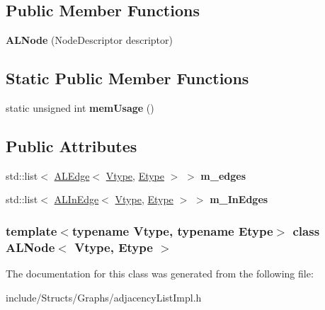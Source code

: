 \subsection*{Public Member Functions}
\begin{DoxyCompactItemize}
\item 
\hypertarget{class_a_l_node_a3131171c179e3556dbb77df163d859de}{
{\bfseries ALNode} (NodeDescriptor descriptor)}
\label{class_a_l_node_a3131171c179e3556dbb77df163d859de}

\end{DoxyCompactItemize}
\subsection*{Static Public Member Functions}
\begin{DoxyCompactItemize}
\item 
\hypertarget{class_a_l_node_a6e597f8610602774abd587d0839f3013}{
static unsigned int {\bfseries memUsage} ()}
\label{class_a_l_node_a6e597f8610602774abd587d0839f3013}

\end{DoxyCompactItemize}
\subsection*{Public Attributes}
\begin{DoxyCompactItemize}
\item 
\hypertarget{class_a_l_node_af00fd390c132316c5becc1097607c5c5}{
std::list$<$ \hyperlink{class_a_l_edge}{ALEdge}$<$ \hyperlink{class_vtype}{Vtype}, \hyperlink{class_etype}{Etype} $>$ $>$ {\bfseries m\_\-edges}}
\label{class_a_l_node_af00fd390c132316c5becc1097607c5c5}

\item 
\hypertarget{class_a_l_node_ae3053593d7252de59c97630d7f9e9c8a}{
std::list$<$ \hyperlink{class_a_l_in_edge}{ALInEdge}$<$ \hyperlink{class_vtype}{Vtype}, \hyperlink{class_etype}{Etype} $>$ $>$ {\bfseries m\_\-InEdges}}
\label{class_a_l_node_ae3053593d7252de59c97630d7f9e9c8a}

\end{DoxyCompactItemize}
\subsubsection*{template$<$typename Vtype, typename Etype$>$ class ALNode$<$ Vtype, Etype $>$}



The documentation for this class was generated from the following file:\begin{DoxyCompactItemize}
\item 
include/Structs/Graphs/adjacencyListImpl.h\end{DoxyCompactItemize}
